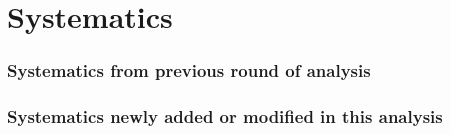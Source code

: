 \chapter{Systematics}

\subsection{Systematics from previous round of analysis}
\subsection{Systematics newly added or modified in this analysis}
